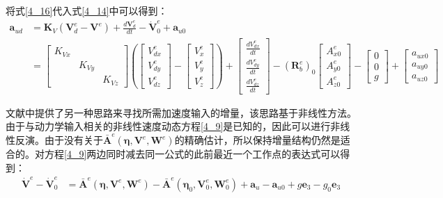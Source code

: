 将式\eqref{4_16}代入式\eqref{4_14}中可以得到：
\begin{equation}
    \begin{aligned}
        \boldsymbol{a}_{ud}&=\boldsymbol{K}_{V}(\boldsymbol{V}_d^e-\boldsymbol{V}^e)+\frac{d\boldsymbol{V}^e_d}{dt}-\boldsymbol{\dot{V}}^e_0+\boldsymbol{a}_{u0}\\
        &= \left[\begin{array}{ccc}{K}_{V x} & & \\& {K}_{V y} & \\& & {K}_{V z}\end{array}\right]
        \left (\begin{bmatrix}V^e_{dx} \\ V^e_{dy} \\ V^e_{dz} \end{bmatrix}-\begin{bmatrix}V^e_{x} \\ V^e_{y} \\ V^e_{z}
        \end{bmatrix}\right )+
        \begin{bmatrix}\frac{dV^e_{dx}}{dt} \\\frac{dV^e_{dy}}{dt} \\\frac{dV^e_{dz}}{dt}
        \end{bmatrix}-
        (\boldsymbol{R}_b^e)_0\begin{bmatrix}A_{x0}^e \\A_{y0}^e \\A_{z0}^e\end{bmatrix}-
        \begin{bmatrix}0 \\0 \\g\end{bmatrix}+
        \begin{bmatrix}a_{ux0} \\a_{uy0} \\a_{uz0}\end{bmatrix}
    \end{aligned}
    \label{4_18}
\end{equation}

文献\parencite{smeurCascadedIncrementalNonlinear2018b}中提供了另一种思路来寻找所需加速度输入的增量，该思路基于非线性方法。由于与动力学输入相关的非线性速度动态方程\eqref{4_9}是已知的，因此可以进行非线性反演。由于没有关于$\bar{\boldsymbol{A}}^e(\boldsymbol{\eta},\boldsymbol{V}^e,\boldsymbol{W}^e)$的精确估计，所以保持增量结构仍然是适合的。对方程\eqref{4_9}两边同时减去同一公式的此前最近一个工作点的表达式可以得到：
\begin{equation}
    \begin{aligned}
        \dot{\boldsymbol{V}}^e - \dot{\boldsymbol{V}}^e_0&=
        \bar{\boldsymbol{A}}^e(\boldsymbol{\eta},\boldsymbol{V}^e,\boldsymbol{W}^e) - \bar{\boldsymbol{A}}^e(\boldsymbol{\eta}_0,\boldsymbol{V}^e_0,\boldsymbol{W}^e_0) +\boldsymbol{a}_u - \boldsymbol{a}_{u0}+g\boldsymbol{e}_3 - g_0\boldsymbol{e}_3
    \end{aligned}
    \label{4_19}
\end{equation}

